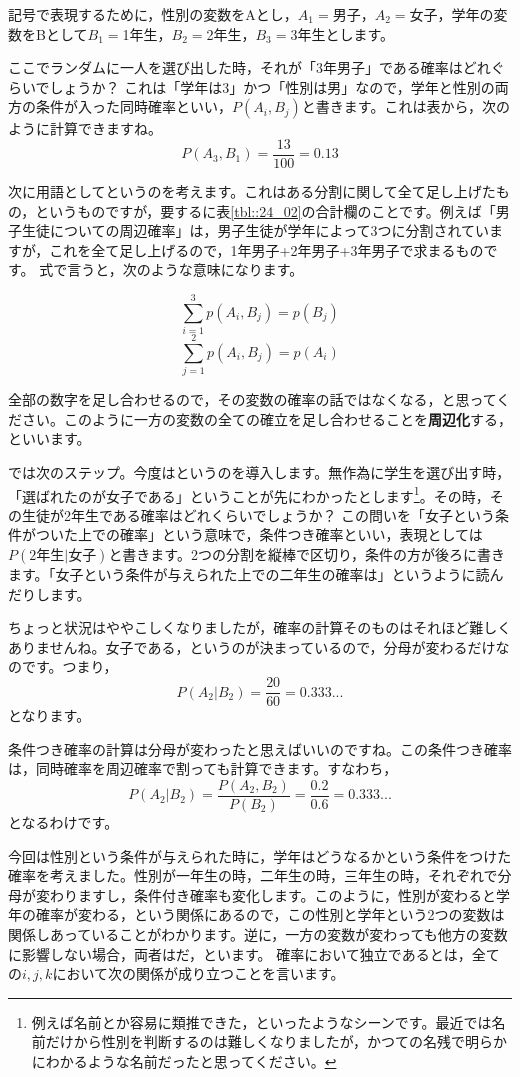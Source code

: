 \documentclass{ltjbook}
\begin{document}
記号で表現するために，性別の変数をAとし，$A_1=$男子，$A_2=$女子，学年の変数をBとして$B_1=$1年生，$B_2=$2年生，$B_3=$3年生とします。

ここでランダムに一人を選び出した時，それが「3年男子」である確率はどれぐらいでしょうか？ これは「学年は3」かつ「性別は男」なので，学年と性別の両方の条件が入った同時確率といい，$P(A_i,B_j)$と書きます。これは表から，次のように計算できますね。
\[ P(A_3,B_1)= \frac{13}{100}=0.13 \]

次に用語としてというのを考えます。これはある分割に関して全て足し上げたもの，というものですが，要するに表\ref{tbl::24_02}の合計欄のことです。例えば「男子生徒についての周辺確率」は，男子生徒が学年によって3つに分割されていますが，これを全て足し上げるので，1年男子+2年男子+3年男子で求まるものです。
式で言うと，次のような意味になります。

\[ \sum_{i=1}^3 p(A_i,B_j) = p(B_j) \]
\[ \sum_{j=1}^2 p(A_i,B_j) = p(A_i) \]

全部の数字を足し合わせるので，その変数の確率の話ではなくなる，と思ってください。このように一方の変数の全ての確立を足し合わせることを\textbf{周辺化}する，といいます。

では次のステップ。今度はというのを導入します。無作為に学生を選び出す時，「選ばれたのが女子である」ということが先にわかったとします\footnote{例えば名前とか容易に類推できた，といったようなシーンです。最近では名前だけから性別を判断するのは難しくなりましたが，かつての名残で明らかにわかるような名前だったと思ってください。}。その時，その生徒が2年生である確率はどれくらいでしょうか？ この問いを「女子という条件がついた上での確率」という意味で，条件つき確率といい，表現としては$P(\mbox{2年生}|\mbox{女子})$と書きます。2つの分割を縦棒で区切り，条件の方が後ろに書きます。「女子という条件が与えられた上での二年生の確率は」というように読んだりします。

ちょっと状況はややこしくなりましたが，確率の計算そのものはそれほど難しくありませんね。女子である，というのが決まっているので，分母が変わるだけなのです。つまり，
\[P(A_2|B_2)=\frac{20}{60}=0.333... \]
となります。

条件つき確率の計算は分母が変わったと思えばいいのですね。この条件つき確率は，同時確率を周辺確率で割っても計算できます。すなわち，
\[ P(A_2|B_2) = \frac{P(A_2,B_2)}{P(B_2)}=\frac{0.2}{0.6}=0.333... \]
となるわけです。

今回は性別という条件が与えられた時に，学年はどうなるかという条件をつけた確率を考えました。性別が一年生の時，二年生の時，三年生の時，それぞれで分母が変わりますし，条件付き確率も変化します。このように，性別が変わると学年の確率が変わる，という関係にあるので，この性別と学年という2つの変数は関係しあっていることがわかります。逆に，一方の変数が変わっても他方の変数に影響しない場合，両者はだ，といます。
確率において独立であるとは，全ての$i,j,k$において次の関係が成り立つことを言います。
\end{document}
